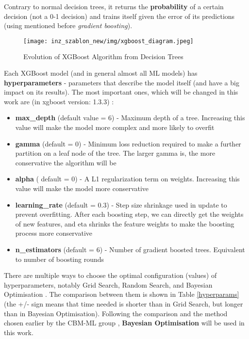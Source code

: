 Contrary to normal decision trees, it returns the \textbf{probability} of a certain decision (not a 0-1 decision) and trains itself given the error of its predictions (using mentioned before \emph{gradient boosting}).
\begin{figure}[H]
    \centering
    \texttt{[image: inz\_szablon\_new/img/xgboost\_diagram.jpeg]}
    \caption{Evolution of XGBoost Algorithm from Decision Trees \cite{xgboost1}}
    \label{xgboost diagram}
\end{figure}
Each XGBoost model (and in general almost all ML models) has \textbf{hyperparameters} - parameters that describe the model itself (and have a big impact on its results). The most important ones, which will be changed in this work are (in xgboost version: 1.3.3) \cite{xgboost-doc}:
\begin{itemize}
    \item \textbf{max\_depth} (default value = 6) - Maximum depth of a tree. Increasing this value will make the model more complex and more likely to overfit
    \item \textbf{gamma} (default = 0) - Minimum loss reduction required to make a further partition on a leaf node of the tree. The larger gamma is, the more conservative the algorithm will be
    \item \textbf{alpha} ( default = 0) - A L1 regularization term on weights. Increasing this value will make the model more conservative
    \item \textbf{learning\_rate} (default = 0.3) - Step size shrinkage used in update to prevent overfitting. After each boosting step, we can directly get the weights of new features, and eta shrinks the feature weights to make the boosting process more conservative
    \item \textbf{n\_estimators} (default = 6) - Number of gradient boosted trees. Equivalent to number of boosting rounds\\
\end{itemize}

There are multiple ways to choose the optimal configuration (values) of hyperparameters, notably Grid Search, Random Search,  and Bayesian Optimisation \cite{compare hyper}. The comparison between them is shown in  Table \ref{hyperparams} (the +/- sign means that time needed is shorter than in Grid Search, but longer than in Bayesian Optimisation). Following the comparison and the method chosen earlier by the CBM-ML group \cite{shahid}, \textbf{Bayesian Optimisation} will be used in this work.\\

